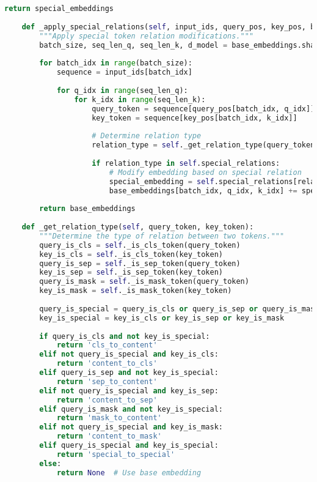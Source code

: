 \begin{lstlisting}[language=Python, caption=Relative position encoding with special token awareness]
        return special_embeddings
        
    def _apply_special_relations(self, input_ids, query_pos, key_pos, base_embeddings):
        """Apply special token relation modifications."""
        batch_size, seq_len_q, seq_len_k, d_model = base_embeddings.shape
        
        for batch_idx in range(batch_size):
            sequence = input_ids[batch_idx]
            
            for q_idx in range(seq_len_q):
                for k_idx in range(seq_len_k):
                    query_token = sequence[query_pos[batch_idx, q_idx]]
                    key_token = sequence[key_pos[batch_idx, k_idx]]
                    
                    # Determine relation type
                    relation_type = self._get_relation_type(query_token, key_token)
                    
                    if relation_type in self.special_relations:
                        # Modify embedding based on special relation
                        special_embedding = self.special_relations[relation_type]
                        base_embeddings[batch_idx, q_idx, k_idx] += special_embedding
                        
        return base_embeddings
        
    def _get_relation_type(self, query_token, key_token):
        """Determine the type of relation between two tokens."""
        query_is_cls = self._is_cls_token(query_token)
        key_is_cls = self._is_cls_token(key_token)
        query_is_sep = self._is_sep_token(query_token)
        key_is_sep = self._is_sep_token(key_token)
        query_is_mask = self._is_mask_token(query_token)
        key_is_mask = self._is_mask_token(key_token)
        
        query_is_special = query_is_cls or query_is_sep or query_is_mask
        key_is_special = key_is_cls or key_is_sep or key_is_mask
        
        if query_is_cls and not key_is_special:
            return 'cls_to_content'
        elif not query_is_special and key_is_cls:
            return 'content_to_cls'
        elif query_is_sep and not key_is_special:
            return 'sep_to_content'
        elif not query_is_special and key_is_sep:
            return 'content_to_sep'
        elif query_is_mask and not key_is_special:
            return 'mask_to_content'
        elif not query_is_special and key_is_mask:
            return 'content_to_mask'
        elif query_is_special and key_is_special:
            return 'special_to_special'
        else:
            return None  # Use base embedding
\end{lstlisting}

